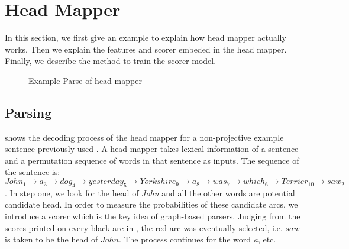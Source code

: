 \section{Head Mapper}
In this section, we first give an example to explain how head mapper actually works. Then we explain
the features and scorer embeded in the head mapper. Finally, we describe the method to train the scorer model.


\begin{figure*}[th]
\centering
{}
\caption{Example Parse of head mapper}
\label{fig:egparse}
\end{figure*}

\subsection{Parsing}
 shows the decoding process of the head mapper
for a non-projective example sentence previously used \cite{mcdonald2005non}.
A head mapper takes lexical information of a sentence and
a permutation sequence of words in that sentence as inputs.
The sequence of the sentence is:%
$John_{1}\rightarrow a_{3}\rightarrow dog_{4}\rightarrow yesterday_{5}\rightarrow Yorkshire_{9}\rightarrow a_{8}\rightarrow was_{7}\rightarrow which_{6}\rightarrow Terrier_{10}\rightarrow saw_{2}$.
In step one, we look for the head of \textit{John} and
all the other words are potential candidate head. In order to measure
the probabilities of these candidate arcs, we introduce a scorer which
is the key idea of graph-based parsers. Judging from the scores
printed on every black arc in ,
the red arc was eventually selected, i.e. $saw$ is taken to be the head
of $John$.  The process continues for the word \textit{a}, etc.

